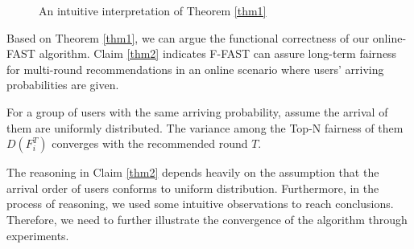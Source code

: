 \begin{figure}[htbp]
  \centering
  \hspace{0.1in} %
  \caption{An intuitive interpretation of Theorem \ref{thm1}
  \label{fig:thm1}}
\end{figure}


Based on Theorem \ref{thm1}, we can argue the functional correctness of our online-FAST algorithm. Claim \ref{thm2} indicates F-FAST can assure long-term fairness for multi-round recommendations in an online scenario where users' arriving probabilities are given.


\begin{claim} For a group of users with the same arriving probability, assume the arrival of them are uniformly distributed. The variance among the Top-N fairness of them $D\left(F_{i}^{T}\right)$ converges with the recommended round $T$.
\label{thm2}
\end{claim}

The reasoning in Claim \ref{thm2} depends heavily on the assumption that the arrival order of users conforms to uniform distribution. Furthermore, in the process of reasoning, we used some intuitive observations to reach conclusions. Therefore, we need to further illustrate the convergence of the algorithm through experiments. 
